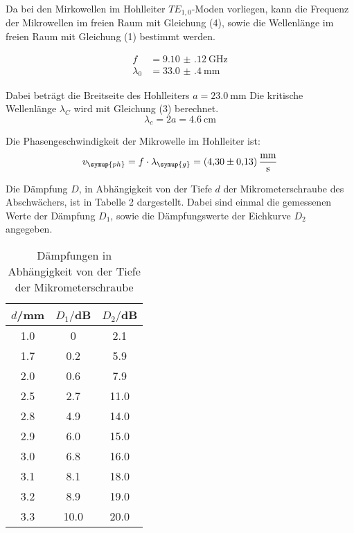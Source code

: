 Da bei den Mirkowellen im Hohlleiter $TE_{1,0}$-Moden vorliegen, kann die Frequenz der
Mikrowellen im freien Raum mit Gleichung (4), sowie die Wellenlänge im freien Raum mit Gleichung (1)
bestimmt werden.

\begin{align*}
  f &= \SI{9.10(12)}{\giga\hertz} \\
  \lambda_{0} &= \SI{33.0(4)}{\milli\meter}
\end{align*}

Dabei beträgt die Breitseite des Hohlleiters $a= \SI{23.0}{\milli\meter}$
Die kritische Wellenlänge $\lambda_C$ wird mit Gleichung (3) berechnet.
\begin{equation*}
  \lambda_c = 2a = \SI{4.6}{\centi\meter}
\end{equation*}

Die Phasengeschwindigkeit der Mikrowelle im Hohlleiter ist:
\begin{equation*}
  v_{\symup{ph}} = f \cdot \lambda_{\symup{g}} = \SI{4.30(13)}{\milli\meter\per\second}
\end{equation*}

Die Dämpfung $D$, in Abhängigkeit von der Tiefe $d$ der Mikrometerschraube des Abschwächers, ist in Tabelle 2
dargestellt. Dabei sind einmal die gemessenen Werte der Dämpfung $D_1$, sowie die Dämpfungswerte der
Eichkurve $D_2$ angegeben.


\begin{table}[H]
  \centering
  \caption{Dämpfungen in Abhängigkeit von der Tiefe der Mikrometerschraube}
  \label{tab:Parameter}
  \begin{tabular}{c c c}
    \toprule
    $d$/mm & $D_1/$dB & $D_2/$dB\\
    \midrule
    1.0 &  0  & 2.1    \\
    1.7 &  0.2  & 5.9    \\
    2.0 &  0.6  & 7.9    \\
    2.5 &  2.7  & 11.0    \\
    2.8 &  4.9  & 14.0    \\
    2.9 &  6.0  & 15.0    \\
    3.0 &  6.8  & 16.0    \\
    3.1 &  8.1  & 18.0    \\
    3.2 &  8.9  & 19.0    \\
    3.3 &  10.0 & 20.0    \\
    \bottomrule
  \end{tabular}
\end{table}

